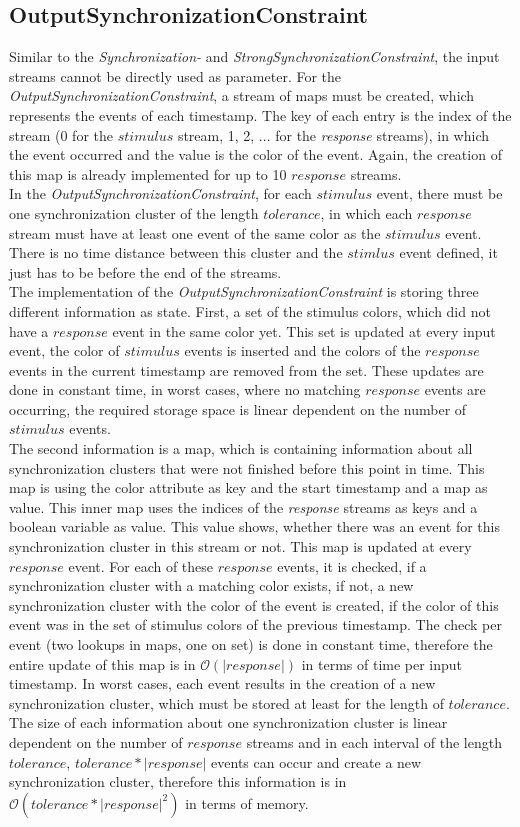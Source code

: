 \subsection{OutputSynchronizationConstraint}
	Similar to the \emph{Synchronization-} and \emph{StrongSynchronizationConstraint}, the input streams cannot be directly used as parameter. For the \emph{OutputSynchronizationConstraint}, a stream of maps must be created, which represents the events of each timestamp. The key of each entry is the index of the stream (0 for the $stimulus$ stream, 1, 2, ... for the \textit{response} streams), in which the event occurred and the value is the color of the event. Again, the creation of this map is already implemented for up to 10 $response$ streams.\\
	In the \emph{OutputSynchronizationConstraint}, for each $stimulus$ event, there must be one synchronization cluster of the length $tolerance$, in which each $response$ stream must have at least one event of the same color as the $stimulus$ event. There is no time distance between this cluster and the $stimlus$ event defined, it just has to be before the end of the streams.\\
	The implementation of the \emph{OutputSynchronizationConstraint} is storing three different information as state. First, a set of the stimulus colors, which did not have a $response$ event in the same color yet. This set is updated at every input event, the color of $stimulus$ events is inserted and the colors of the $response$ events in the current timestamp are removed from the set. These updates are done in constant time, in worst cases, where no matching $response$ events are occurring, the required storage space is linear dependent on the number of $stimulus$ events.\\
	The second information is a map, which is containing information about all synchronization clusters that were not finished before this point in time. This map is using the color attribute as key and the start timestamp and a map as value. This inner map uses the indices of the \textit{response} streams as keys and a boolean variable as value. This value shows, whether there was an event for this synchronization cluster in this stream or not. This map is updated at every $response$ event. For each of these $response$ events, it is checked, if a synchronization cluster with a matching color exists, if not, a new synchronization cluster with the color of the event is created, if the color of this event was in the set of stimulus colors of the previous timestamp. The check per event (two lookups in maps, one on set) is done in constant time, therefore the entire update of this map is in $\mathcal{O}(|response|)$ in terms of time per input timestamp. In worst cases, each event results in the creation of a new synchronization cluster, which must be stored at least for the length of $tolerance$. The size of each information about one synchronization cluster is linear dependent on the number of $response$ streams and in each interval of the length $tolerance$, $tolerance*|response|$ events can occur and create a new synchronization cluster, therefore this information is in $\mathcal{O}(tolerance*|response|^2)$ in terms of memory.\\
